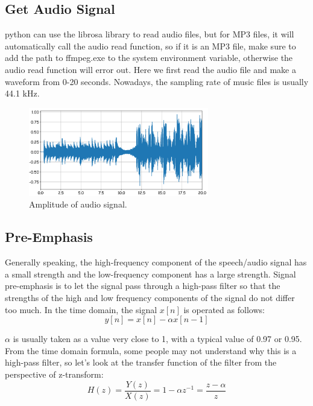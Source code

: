 \subsection{Get Audio Signal}

python can use the librosa library to read audio files, but for MP3 files, it will automatically call the audio read function, so if it is an MP3 file, make sure to add the path to ffmpeg.exe to the system environment variable, otherwise the audio read function will error out. Here we first read the audio file and make a waveform from 0-20 seconds. Nowadays, the sampling rate of music files is usually 44.1 kHz. 
\begin{figure}[!htbp]
	\centering
	\includegraphics[width = 0.7\textwidth]{figures_ning/audio_1.png}
	\caption[L2 Regularization]
	{ Amplitude of audio signal.}
	\label{fig:audio_1}
\end{figure}

\subsection{Pre-Emphasis}

Generally speaking, the high-frequency component of the speech/audio signal has a small strength and the low-frequency component has a large strength. Signal pre-emphasis is to let the signal pass through a high-pass filter so that the strengths of the high and low frequency components of the signal do not differ too much. In the time domain, the signal $x[n]$ is operated as follows:
$$
y[n]=x[n]-\alpha x[n-1]
$$

$\alpha$ is usually taken as a value very close to 1, with a typical value of 0.97 or 0.95. From the time domain formula, some people may not understand why this is a high-pass filter, so let's look at the transfer function of the filter from the perspective of z-transform:
$$
H(z)=\frac{Y(z)}{X(z)}=1-\alpha z^{-1}=\frac{z-\alpha}{z}
$$

